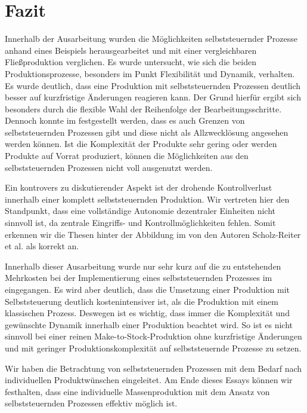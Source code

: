 \section{Fazit}
\label{sec:Fazit}

Innerhalb der Ausarbeitung wurden die Möglichkeiten selbststeuernder Prozesse
anhand eines Beispiels herausgearbeitet und mit einer vergleichbaren
Fließproduktion verglichen. Es wurde untersucht, wie sich die beiden
Produktionsprozesse, besonders im Punkt Flexibilität und Dynamik, verhalten. Es
wurde deutlich, dass eine Produktion mit selbststeuernden Prozessen deutlich
besser auf kurzfristige Änderungen reagieren kann. Der Grund hierfür ergibt
sich besonders durch die flexible Wahl der Reihenfolge der
Bearbeitungsschritte. Dennoch konnte im  festgestellt werden,
dass es auch Grenzen von selbststeuernden Prozessen gibt und diese nicht als
Allzwecklösung angesehen werden können. Ist die Komplexität der Produkte sehr
gering oder werden Produkte auf Vorrat produziert, können die Möglichkeiten aus
den selbststeuernden Prozessen nicht voll ausgenutzt werden.

Ein kontrovers zu diskutierender Aspekt ist der drohende Kontrollverlust
innerhalb einer komplett selbststeuernden Produktion. Wir vertreten hier den
Standpunkt, dass eine vollständige Autonomie dezentraler Einheiten nicht
sinnvoll ist, da zentrale Eingriffs- und Kontrollmöglichkeiten fehlen.
Somit erkennen wir die Thesen hinter der Abbildung im  von den
Autoren Scholz-Reiter et al. als korrekt an.

Innerhalb dieser Ausarbeitung wurde nur sehr kurz auf die zu entstehenden
Mehrkosten bei der Implementierung eines selbststeuernden Prozesses im
 eingegangen. Es wird aber deutlich, dass
die Umsetzung einer Produktion mit Selbststeuerung deutlich kostenintensiver
ist, als die Produktion mit einem klassischen Prozess. Deswegen ist es
wichtig, dass immer die Komplexität und gewünschte Dynamik innerhalb einer Produktion
beachtet wird. So ist es nicht sinnvoll bei einer reinen
Make-to-Stock-Produktion ohne kurzfristige Änderungen und mit geringer
Produktionskomplexität auf selbst\-steu\-ern\-de Prozesse zu setzen.

Wir haben die Betrachtung von selbststeuernden Prozessen mit dem Bedarf nach
individuellen Produktwünschen eingeleitet. Am Ende dieses Essays können wir
festhalten, dass eine individuelle Massenproduktion mit dem Ansatz von
selbststeuernden Prozessen effektiv möglich ist.


